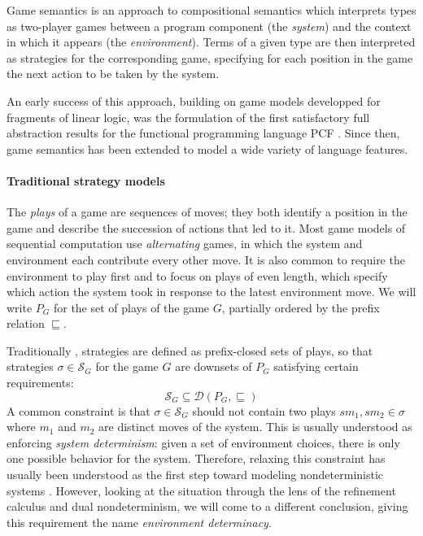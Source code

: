 \documentclass[format=sigplan,authordraft]{acmart}
\begin{document}
Game semantics is an approach to compositional semantics
which interprets types as two-player games
between a program component (the \emph{system})
and the context in which it appears (the \emph{environment}).
Terms of a given type are then interpreted as
strategies for the corresponding game,
specifying for each position in the game
the next action to be taken by the system.

An early success of this approach,
building on game models developped for
fragments of linear logic,
was the formulation of the first satisfactory
full abstraction results
for the functional programming language PCF \cite{pcfajm,pcfho}.
Since then,
game semantics has been extended to
model a wide variety of language features.

\paragraph{Traditional strategy models} %

The \emph{plays} of a game are sequences of moves;
they both identify a position in the game
and describe the succession of actions that led to it.
Most game models of sequential computation
use \emph{alternating} games,
in which
the system and environment each contribute
every other move.
It is also common to require the environment to play first
and to focus on plays of even length,
which specify which action the system took
in response to the latest environment move.
We will write $P_G$ for the set of plays of the game $G$,
partially ordered by the prefix relation $\sqsubseteq$.

Traditionally \cite{gamesem99},
strategies are defined as
prefix-closed sets of plays,
so that strategies $\sigma \in \mathcal{S}_G$
for the game $G$ are downsets of $P_G$
satisfying certain requirements:
\[
    \mathcal{S}_G \subseteq
    \mathcal{D}(P_G, {\sqsubseteq})
\]
A common constraint is that $\sigma \in \mathcal{S}_G$
should not contain two plays $s m_1, s m_2 \in \sigma$
where $m_1$ and $m_2$ are distinct moves of the system.
This is usually understood as
enforcing \emph{system determinism}:
given a set of environment choices,
there is only one possible behavior for the system.
Therefore,
relaxing this constraint has usually been understood
as the first step toward modeling nondeterministic systems
\cite{gsfnd}.
However,
looking at the situation through the lens of
the refinement calculus and dual nondeterminism,
we will come to a different conclusion,
giving this requirement the name
\emph{environment determinacy}.
\end{document}
